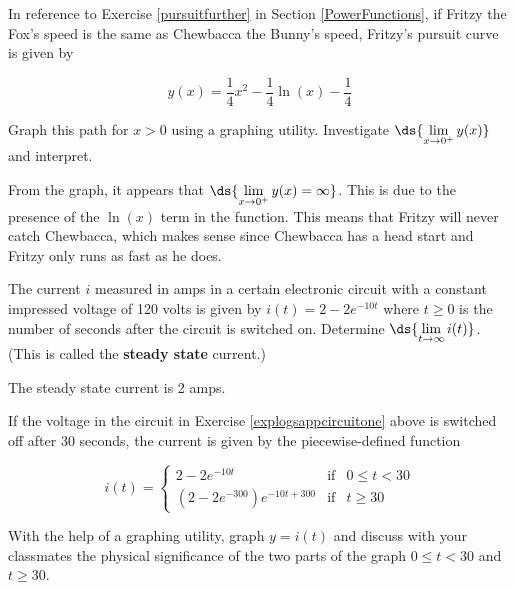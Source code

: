 \documentclass{ximera}
\begin{document}
\begin{problem}\label{pursuitlog}
     In reference to Exercise \ref{pursuitfurther} in Section \ref{PowerFunctions}, if Fritzy the Fox's speed is the same as Chewbacca the Bunny's speed, Fritzy's pursuit curve is given by

\[y(x) = \frac{1}{4} x^2-\frac{1}{4} \ln(x)-\frac{1}{4}\]

Graph this path for $x > 0$ using a graphing utility.  Investigate  $\ds{\lim_{x \rightarrow 0^{+}}  y(x)}$ and interpret.

\begin{solution}
    From the graph, it appears that $\ds{\lim_{x \rightarrow 0^{+}} y(x) = \infty}$.  This is due to the presence of the $\ln(x)$ term in the function.  This means that Fritzy will never catch Chewbacca, which makes sense since Chewbacca has a head start and Fritzy only runs as fast as he does.
\end{solution}

\end{problem}

\begin{problem}\label{explogsappcircuitone}
    The current $i$ measured in amps in a certain electronic circuit with a constant impressed voltage of 120 volts is given by $i(t) = 2 - 2e^{-10t}$ where $t \geq 0$ is the number of seconds after the circuit is switched on.  Determine  $\ds{\lim_{t \rightarrow \infty} i(t)}$.  (This is called the \textbf{steady state} current.)

\begin{solution}
    The steady state current is 2 amps.
\end{solution}
    
\end{problem}

\begin{problem}
     If the voltage in the circuit in Exercise \ref{explogsappcircuitone} above is switched off after 30 seconds, the current is given by the piecewise-defined function 

\[i(t) = \left\{ \begin{array}{rcl} 2 - 2e^{-10t} & \mbox{if} & 0 \leq t < 30 \\ 
\left(2 - 2e^{-300}\right) e^{-10t+300} & \mbox{if} & t \geq 30 \end{array} \right.\] 

With the help of a graphing utility, graph $y = i(t)$ and discuss with your classmates the physical significance of the two parts of the graph $0 \leq t < 30$ and $t \geq 30$.
\end{problem}
\end{document}
